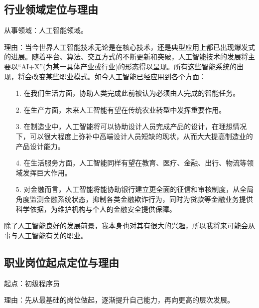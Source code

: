 \documentclass{article}
\begin{document}
\subsection{行业领域定位与理由}
\par
从事领域：人工智能领域。\par
理由：当今世界人工智能技术无论是在核心技术，还是典型应用上都已出现爆发式的进展。随着平台、算法、交互方式的不断更新和突破，人工智能技术的发展将主要以“AI+X”(为某一具体产业或行业)的形态得以呈现。所有这些智能系统的出现，将会改变某些职业模式。如今人工智能已经应用到各个方面：\par
\begin{itemize}
\item[1.]在我们生活方面，协助人类完成此前被认为必须由人完成的智能任务。
\item[2.]在生产方面，未来人工智能有望在传统农业转型中发挥重要作用。
\item[3.]在制造业中，人工智能将可以协助设计人员完成产品的设计，在理想情况下，可以很大程度上弥补中高端设计人员短缺的现状，从而大大提高制造业的产品设计能力。
\item[4.]在生活服务方面，人工智能同样有望在教育、医疗、金融、出行、物流等领域发挥巨大作用。
\item[5.]对金融而言，人工智能将能协助银行建立更全面的征信和审核制度，从全局角度监测金融系统状态，抑制各类金融欺诈行为，同时为贷款等金融业务提供科学依据，为维护机构与个人的金融安全提供保障。
\end{itemize}
\par
除了人工智能良好的发展前景，我本身也对其有很大的兴趣，所以我将来可能会从事与人工智能有关的职业。
\subsection{职业岗位起点定位与理由}
\par
起点：初级程序员\par
理由：先从最基础的岗位做起，逐渐提升自己能力，再向更高的层次发展。
\end{document}
